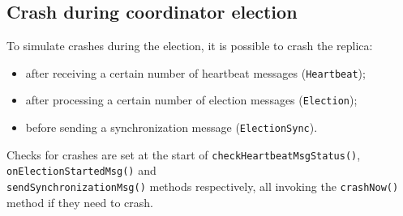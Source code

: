 \subsection{Crash during coordinator election}

To simulate crashes during the election, it is possible to crash the replica:

\begin{itemize}
\item after receiving a certain number of heartbeat messages (\texttt{Heartbeat});

\item after processing a certain number of election messages (\texttt{Election});

\item before sending a synchronization message (\texttt{ElectionSync}).
\end{itemize}

Checks for crashes are set at the start of \texttt{checkHeartbeatMsgStatus()}, \texttt{onElectionStartedMsg()} and \\ \texttt{sendSynchronizationMsg()} methods respectively, all invoking the \texttt{crashNow()} method if they need to crash.

